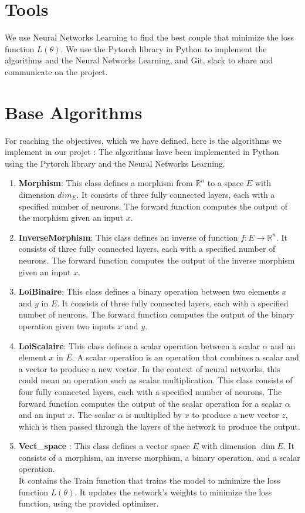 \documentclass{report}
\begin{document}
\section{Tools}
    We use Neural Networks Learning to find the best couple that minimize the loss function $L(\theta)$.
    We use the Pytorch library in Python to implement the algorithms and the Neural Networks Learning, and Git, slack to share and communicate on the project.

\section{Base Algorithms}
    For reaching the objectives, which we have defined, here is the algorithms we implement in our projet  : 
    The algorithms have been implemented in Python using the Pytorch library and the Neural Networks Learning.\\
    \begin{enumerate}
        \item \textbf{Morphism}: This class defines a morphism from 
        $\mathbb{R}^n$ to a space $E$ with dimension $dim_E$. 
        It consists of three fully connected layers, each with 
        a specified number of neurons. The forward function computes 
        the output of the morphism given an input $x$.
        \item \textbf{InverseMorphism}: This class defines an inverse
        of function $f: E \rightarrow \mathbb{R}^n$. It consists of
        three fully connected layers, each with a specified number
        of neurons. The forward function computes the output of the
        inverse morphism given an input $x$.
        \item \textbf{LoiBinaire}: This class defines a binary operation 
        between two elements $x$ and $y$ in $E$. It consists of three 
        fully connected layers, each with a specified number of neurons. 
        The forward function computes the output of the binary operation 
        given two inputs $x$ and $y$.
        \item \textbf{LoiScalaire}: 
        This class defines a scalar operation between a scalar $\alpha$ and an element $x$ in $E$. A scalar operation is an operation that combines a scalar and a vector to produce a new vector. In the context of neural networks, this could mean an operation such as scalar multiplication. This class consists of four fully connected layers, each with a specified number of neurons. The forward function computes the output of the scalar operation for a scalar $\alpha$ and an input $x$. The scalar $\alpha$ is multiplied by $x$ to produce a new vector $z$, which is then passed through the layers of the network to produce the output.
        \item \textbf{Vect\_space} : This class defines a vector space $E$ with dimension $\dim{E}$. It consists of a morphism, an inverse morphism, a binary operation, and a scalar operation. 
        \\ 
        It contains the Train function that trains the model to minimize the loss function $L(\theta)$. It updates the network's weights to minimize the loss function, using the provided optimizer. 
    \end{enumerate}
\end{document}
